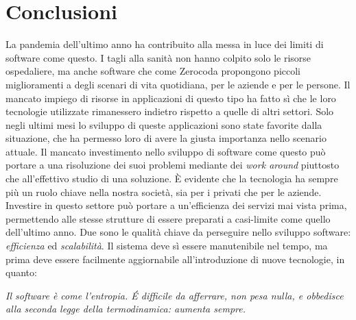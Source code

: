 \chapter*{Conclusioni}
\label{chap:conclusion}
La pandemia dell'ultimo anno ha contribuito alla messa in luce dei limiti di software come questo. I tagli alla sanità non hanno colpito solo le risorse ospedaliere, ma anche software che come Zerocoda propongono piccoli miglioramenti a degli scenari di vita quotidiana, per le aziende e per le persone. Il mancato impiego di risorse in applicazioni di questo tipo ha fatto sì che le loro tecnologie utilizzate rimanessero indietro rispetto a quelle di altri settori. Solo negli ultimi mesi lo sviluppo di queste applicazioni sono state favorite dalla situazione, che ha permesso loro di avere la giusta importanza nello scenario attuale. Il mancato investimento nello sviluppo di software come questo può portare a una risoluzione dei suoi problemi mediante dei \emph{work around} piuttosto che all'effettivo studio di una soluzione. È evidente che la tecnologia ha sempre più un ruolo chiave nella nostra società, sia per i privati che per le aziende. Investire in questo settore può portare a un'efficienza dei servizi mai vista prima, permettendo alle stesse strutture di essere preparati a casi-limite come quello dell'ultimo anno. Due sono le qualità chiave da perseguire nello sviluppo software: \emph{efficienza} ed \emph{scalabilità}. Il sistema deve sì essere manutenibile nel tempo, ma prima deve essere facilmente aggiornabile all'introduzione di nuove tecnologie, in quanto:
\begin{center}
    \textit{Il software è come l'entropia. É difficile da afferrare, non pesa nulla, e obbedisce alla seconda legge della termodinamica: aumenta sempre.}
\end{center}
